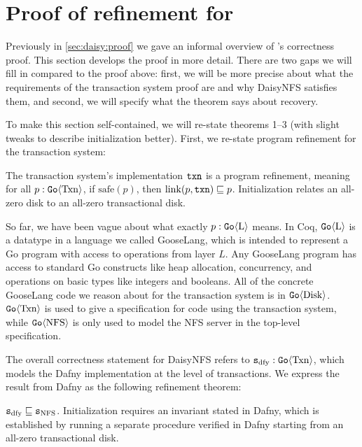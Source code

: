 \section{Proof of refinement for \sys}
\label{appendix:proof}

\setcounter{theorem}{0}

Previously in \cref{sec:daisy:proof} we gave an informal overview of \sys's
correctness proof. This section develops the proof in more detail. There are two
gaps we will fill in compared to the proof above: first, we will be more precise
about what the requirements of the transaction system proof are and why DaisyNFS
satisfies them, and second, we will specify what the theorem says about recovery.

To make this section self-contained, we will re-state theorems 1--3 (with slight
tweaks to describe initialization better). First, we re-state program refinement
for the transaction system:

\begin{theorem}
  The transaction system's implementation $\texttt{txn}$ is a program refinement,
  meaning for all $p : \mathtt{Go}\langle \mathrm{Txn} \rangle$, if $\mathrm{safe}(p)$, then
  $\mathrm{link}(p, \texttt{txn}) \sqsubseteq p$. Initialization relates an all-zero
  disk to an all-zero transactional disk.
  \label{thm:txn-appendix}
\end{theorem}

So far, we have been vague about what exactly $p : \mathtt{Go}\langle \mathrm{L} \rangle$ means. In
Coq, $\mathtt{Go}\langle \mathrm{L} \rangle$ is a datatype in a language we called GooseLang, which is
intended to represent a Go program with access to operations from layer $L$. Any
GooseLang program has access to standard Go constructs like heap allocation,
concurrency, and operations on basic types like integers and booleans. All of
the concrete GooseLang code we reason about for the transaction system is in
$\mathtt{Go}\langle \mathrm{Disk} \rangle$. $\mathtt{Go}\langle \mathrm{Txn} \rangle$ is used to give a specification for code
using the transaction system, while $\mathtt{Go}\langle \mathrm{NFS} \rangle$ is only used to model the
NFS server in the top-level specification.

The overall correctness statement for DaisyNFS refers to
$\texttt{s}_{\mathrm{dfy}} : \mathtt{Go}\langle \mathrm{Txn} \rangle$, which models the Dafny implementation at the level
of transactions. We express the result from Dafny as the following refinement
theorem:

\begin{theorem}
  $\texttt{s}_{\mathrm{dfy}} \sqsubseteq \texttt{s}_{\mathrm{NFS}}$. Initialization requires an invariant stated in Dafny,
  which is established by running a separate  procedure verified in
  Dafny starting from an all-zero transactional disk.
  \label{thm:dafny-appendix}
\end{theorem}

